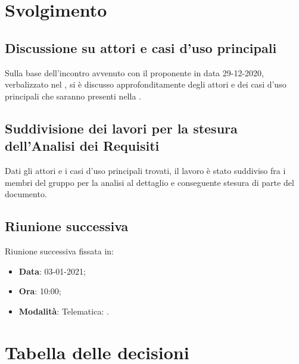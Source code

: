 \documentclass[]{article}
\begin{document}
	\newpage

	\section{Svolgimento}
		\subsection{Discussione su attori e casi d'uso principali}
        Sulla base dell'incontro avvenuto con il proponente in data 29-12-2020, verbalizzato nel , si è discusso approfonditamente degli attori e dei casi d'uso principali che saranno presenti nella .

        \subsection{Suddivisione dei lavori per la stesura dell'Analisi dei Requisiti}
        Dati gli attori e i casi d'uso principali trovati, il lavoro è stato suddiviso fra i membri del gruppo per la analisi al dettaglio e conseguente stesura di parte del documento.

		\subsection{Riunione successiva}
		Riunione successiva fissata in:
		\begin{itemize}
			\item \textbf{Data}: 03-01-2021;
			\item \textbf{Ora}: 10:00;
			\item \textbf{Modalità}: Telematica: .
		\end{itemize}

	\newpage

	\section{Tabella delle decisioni}
\end{document}
